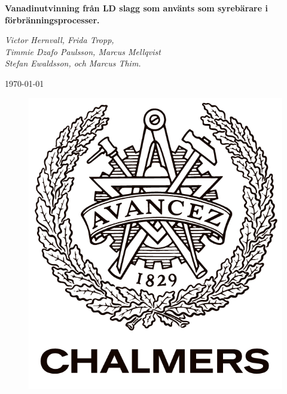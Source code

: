 
\begin{titlepage}
\begin{centering}

{\huge\bfseries Vanadinutvinning från LD slagg som använts som syrebärare i förbränningsprocesser. \par}
\vspace{1cm}
{\scshape\Large \textbf{}\par}
{\scshape\Large \par}
{\Large\itshape Victor Hernvall, Frida Tropp,  \\ Timmie Dzafo Paulsson, Marcus Mellqvist \\ Stefan Ewaldsson, och Marcus Thim.\par}
{\large \today\par}

{   \par}
{   \par}
{    \par}


\begin{figure}[!ht]
\centering
\includegraphics[scale=0.3]{chalmers.png}
\label{fig:chalmers}

\end{figure}


\end{centering}
\end{titlepage}

